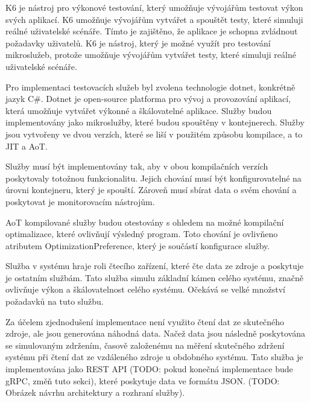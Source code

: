
K6 je nástroj pro výkonové testování, který umožňuje vývojářům testovat výkon svých aplikací. K6 umožňuje vývojářům vytvářet a spouštět testy, které simuluji reálné uživatelské scénáře. Tímto je zajištěno, že aplikace je schopna zvládnout požadavky uživatelů. K6 je nástroj, který je možné využít pro testování mikroslužeb, protože umožňuje vývojářům vytvářet testy, které simuluji reálné uživatelské scénáře.


Pro implementaci testovacích služeb byl zvolena technologie dotnet, konkrétně jazyk C\#. Dotnet je open-source platforma pro vývoj a provozování aplikací, která umožňuje vytvářet výkonné a škálovatelné aplikace. Služby budou implementovány jako mikroslužby, které budou spouštěny v kontejnerech. Služby jsou vytvořeny ve dvou verzích, které se liší v použitém způsobu kompilace, a to JIT a AoT.



Služby musí být implementovány tak, aby v obou kompilačních verzích poskytovaly totožnou funkcionalitu. Jejich chování musí být konfigurovatelné na úrovni kontejneru, který je spouští. Zároveň musí sbírat data o svém chování a poskytovat je monitorovacím nástrojům.

AoT kompilované služby budou otestovány s ohledem na možné kompilační optimalizace, které ovlivňují výsledný program. Toto chování je ovlivňeno atributem OptimizationPreference, který je součástí konfigurace služby.



Služba v systému hraje roli čtecího zařízení, které čte data ze zdroje a poskytuje je ostatním službám. Tato služba simulu základní kámen celého systému, značně ovlivňuje výkon a škálovatelnost celého systému. Očekává se velké množství požadavků na tuto službu.

Za účelem zjednodušení implementace není využito čtení dat ze skutečného zdroje, ale jsou generována náhodná data. Načež data jsou následně poskytována se simulovaným zdržením, časově založenému na měření skutečného zdržení systému při čtení dat ze vzdáleného zdroje u obdobného systému. Tato služba je implementována jako REST API (TODO: pokud konečná implementace bude gRPC, změň tuto sekci), které poskytuje data ve formátu JSON. (TODO: Obrázek návrhu architektury a rozhraní služby).

